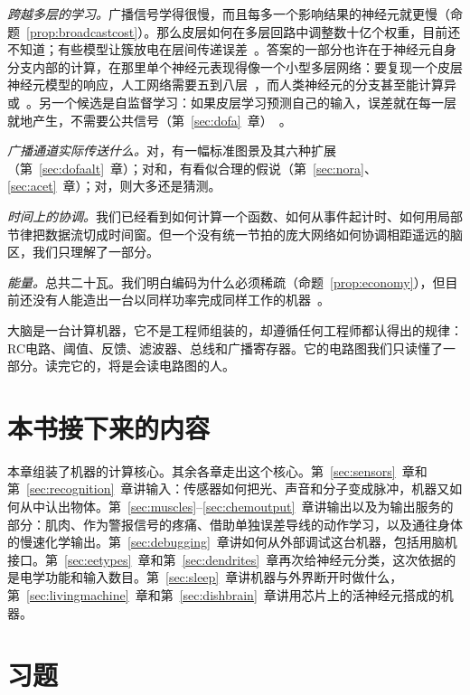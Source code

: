 \emph{跨越多层的学习。}广播信号学得很慢，而且每多一个影响结果的神经元就更慢（命题~\ref{prop:broadcastcost}）。那么皮层如何在多层回路中调整数十亿个权重，目前还不知道；有些模型让簇放电在层间传递误差~\cite{Payeur2021}。答案的一部分也许在于神经元自身分支内部的计算，在那里单个神经元表现得像一个小型多层网络：要复现一个皮层神经元模型的响应，人工网络需要五到八层~\cite{Beniaguev2021}，而人类神经元的分支甚至能计算异或~\cite{Gidon2020}。另一个候选是自监督学习：如果皮层学习预测自己的输入，误差就在每一层就地产生，不需要公共信号（第~\ref{sec:dofa}~章）~\cite{Keller2018}。

\emph{广播通道实际传送什么。}对，有一幅标准图景及其六种扩展（第~\ref{sec:dofaalt}~章）；对和，有看似合理的假说（第~\ref{sec:nora}、\ref{sec:acet}~章）；对，则大多还是猜测。

\emph{时间上的协调。}我们已经看到如何计算一个函数、如何从事件起计时、如何用局部节律把数据流切成时间窗。但一个没有统一节拍的庞大网络如何协调相距遥远的脑区，我们只理解了一部分。

\emph{能量。}总共二十瓦。我们明白编码为什么必须稀疏（命题~\ref{prop:economy}），但目前还没有人能造出一台以同样功率完成同样工作的机器~\cite{MehonicKenyon2022}。

大脑是一台计算机器，它不是工程师组装的，却遵循任何工程师都认得出的规律：RC电路、阈值、反馈、滤波器、总线和广播寄存器。它的电路图我们只读懂了一部分。读完它的，将是会读电路图的人。

\section{本书接下来的内容}

本章组装了机器的计算核心。其余各章走出这个核心。第~\ref{sec:sensors}~章和第~\ref{sec:recognition}~章讲输入：传感器如何把光、声音和分子变成脉冲，机器又如何从中认出物体。第~\ref{sec:muscles}--\ref{sec:chemoutput}~章讲输出以及为输出服务的部分：肌肉、作为警报信号的疼痛、借助单独误差导线的动作学习，以及通往身体的慢速化学输出。第~\ref{sec:debugging}~章讲如何从外部调试这台机器，包括用脑机接口。第~\ref{sec:eetypes}~章和第~\ref{sec:dendrites}~章再次给神经元分类，这次依据的是电学功能和输入数目。第~\ref{sec:sleep}~章讲机器与外界断开时做什么，第~\ref{sec:livingmachine}~章和第~\ref{sec:dishbrain}~章讲用芯片上的活神经元搭成的机器。

\section{习题}

